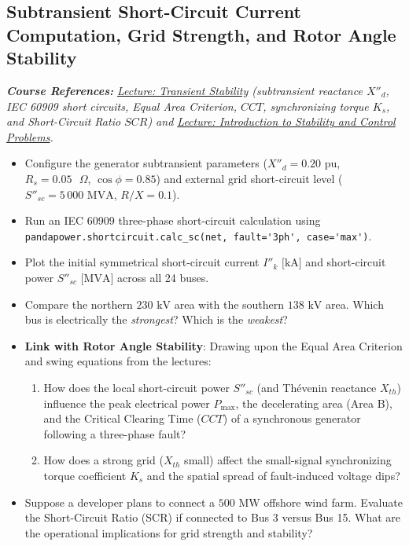 \documentclass[11pt]{article}
\begin{document}
  \subsection{Subtransient Short-Circuit Current Computation, Grid Strength, and Rotor Angle Stability}
  \noindent\textit{\textbf{Course References:} \href{https://github.com/bcornelusse/ELEC0447-analysis-power-systems/blob/master/Lectures/transient/main.pdf}{Lecture: Transient Stability} (subtransient reactance $X''_d$, IEC 60909 short circuits, Equal Area Criterion, $CCT$, synchronizing torque $K_s$, and Short-Circuit Ratio $SCR$) and \href{https://github.com/bcornelusse/ELEC0447-analysis-power-systems/blob/master/Lectures/intro_stability/intro_stability.pdf}{Lecture: Introduction to Stability and Control Problems}.}
  \begin{itemize}
    \item Configure the generator subtransient parameters ($X''_d = 0.20\text{ pu}$, $R_s = 0.05\text{ }\Omega$, $\cos \phi = 0.85$) and external grid short-circuit level ($S''_{sc} = 5\,000\text{ MVA}$, $R/X = 0.1$).
    \item Run an IEC 60909 three-phase short-circuit calculation using \lstinline|pandapower.shortcircuit.calc_sc(net, fault='3ph', case='max')|.
    \item Plot the initial symmetrical short-circuit current $I''_k\text{ [kA]}$ and short-circuit power $S''_{sc}\text{ [MVA]}$ across all 24 buses.
    \item Compare the northern $230\text{ kV}$ area with the southern $138\text{ kV}$ area. Which bus is electrically the \textit{strongest}? Which is the \textit{weakest}? 
    \item \textbf{Link with Rotor Angle Stability}: Drawing upon the Equal Area Criterion and swing equations from the lectures:
    \begin{enumerate}
      \item How does the local short-circuit power $S''_{sc}$ (and Thévenin reactance $X_{th}$) influence the peak electrical power $P_{\max}$, the decelerating area (Area B), and the Critical Clearing Time ($CCT$) of a synchronous generator following a three-phase fault?
      \item How does a strong grid ($X_{th}$ small) affect the small-signal synchronizing torque coefficient $K_s$ and the spatial spread of fault-induced voltage dips?
    \end{enumerate}
    \item Suppose a developer plans to connect a $500\text{ MW}$ offshore wind farm. Evaluate the Short-Circuit Ratio (SCR) if connected to Bus 3 versus Bus 15. What are the operational implications for grid strength and stability?
  \end{itemize}
\end{document}
